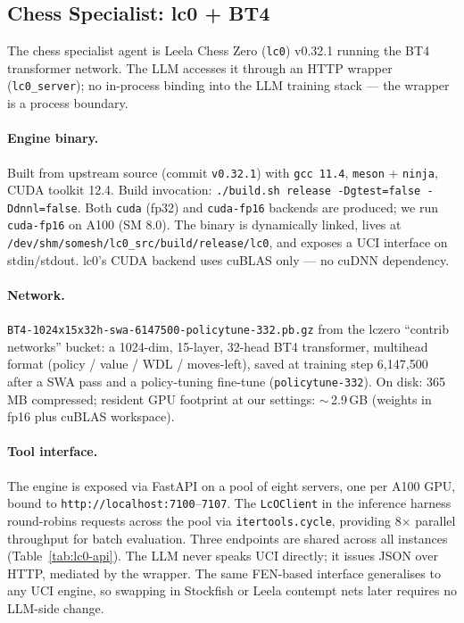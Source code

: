 \subsection{Chess Specialist: lc0 + BT4}
\label{app:details:lc0}

The chess specialist agent is Leela Chess Zero (\texttt{lc0}) v0.32.1 running the BT4 transformer network. The LLM accesses it through an HTTP wrapper (\texttt{lc0\_server}); no in-process binding into the LLM training stack — the wrapper is a process boundary.

\paragraph{Engine binary.}
Built from upstream source (commit \texttt{v0.32.1}) with \texttt{gcc 11.4}, \texttt{meson} + \texttt{ninja}, CUDA toolkit 12.4. Build invocation: \texttt{./build.sh release -Dgtest=false -Ddnnl=false}. Both \texttt{cuda} (fp32) and \texttt{cuda-fp16} backends are produced; we run \texttt{cuda-fp16} on A100 (SM 8.0). The binary is dynamically linked, lives at \texttt{/dev/shm/somesh/lc0\_src/build/release/lc0}, and exposes a UCI interface on stdin/stdout. lc0's CUDA backend uses cuBLAS only — no cuDNN dependency.

\paragraph{Network.}
\texttt{BT4-1024x15x32h-swa-6147500-policytune-332.pb.gz} from the lczero ``contrib networks'' bucket: a 1024-dim, 15-layer, 32-head BT4 transformer, multihead format (policy / value / WDL / moves-left), saved at training step 6{,}147{,}500 after a SWA pass and a policy-tuning fine-tune (\texttt{policytune-332}). On disk: 365\,MB compressed; resident GPU footprint at our settings: $\sim$\,2.9\,GB (weights in fp16 plus cuBLAS workspace).

\paragraph{Tool interface.}
The engine is exposed via FastAPI on a pool of eight servers, one per A100 GPU, bound to \texttt{http://localhost:7100}--\texttt{7107}. The \texttt{LcOClient} in the inference harness round-robins requests across the pool via \texttt{itertools.cycle}, providing 8$\times$ parallel throughput for batch evaluation. Three endpoints are shared across all instances (Table~\ref{tab:lc0-api}). The LLM never speaks UCI directly; it issues JSON over HTTP, mediated by the wrapper. The same FEN-based interface generalises to any UCI engine, so swapping in Stockfish or Leela contempt nets later requires no LLM-side change.

